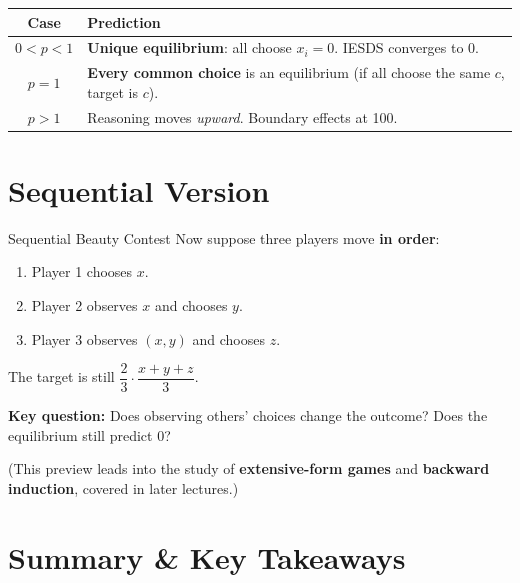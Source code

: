 \documentclass[12pt, a4paper]{article}
\begin{document}
\medskip
\begin{center}
\renewcommand{\arraystretch}{1.4}
\begin{tabular}{>{\bfseries}c p{7cm}}
  \toprule
  \rowcolor{defbluebg}
  Case & Prediction \\
  \midrule
  $0 < p < 1$ & \textbf{Unique equilibrium}: all choose $x_i = 0$. IESDS converges to 0. \\
  \rowcolor{exbg}
  $p = 1$ & \textbf{Every common choice} is an equilibrium (if all choose the same $c$, target is $c$). \\
  $p > 1$ & Reasoning moves \emph{upward}. Boundary effects at 100. \\
  \bottomrule
\end{tabular}
\end{center}

\section{Sequential Version}

\begin{exbox}{Sequential Beauty Contest}
  Now suppose three players move \textbf{in order}:
  \begin{enumerate}[label=\textbf{Step \arabic*.}]
    \item Player 1 chooses $x$.
    \item Player 2 observes $x$ and chooses $y$.
    \item Player 3 observes $(x,y)$ and chooses $z$.
  \end{enumerate}
  The target is still $\dfrac{2}{3} \cdot \dfrac{x+y+z}{3}$.

  \medskip
  \textbf{Key question:} Does observing others' choices change the outcome? Does the equilibrium still predict 0?

  \medskip
  (This preview leads into the study of \textbf{extensive-form games} and \textbf{backward induction}, covered in later lectures.)
\end{exbox}

\section{Summary \& Key Takeaways}
\end{document}
